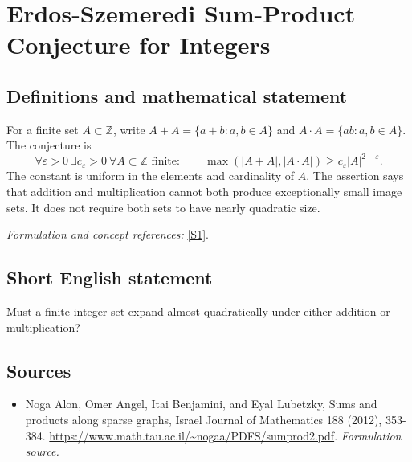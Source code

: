 \documentclass[11pt]{article}
\begin{document}
\section*{\texorpdfstring{Erdos-Szemeredi Sum-Product Conjecture for Integers}{Erdos-Szemeredi Sum-Product Conjecture for Integers}}\label{113}
\subsection{Definitions and mathematical statement}
For a finite set $A\subset{\mathbb{Z}}$, write $A+A=\{a+b:a,b\in A\}$ and $A\cdot A=\{ab:a,b\in A\}$. The conjecture is
\[
 \forall\varepsilon>0\ \exists c_\varepsilon>0\ \forall A\subset{\mathbb{Z}}\text{ finite}:\qquad
 \max(|A+A|,|A\cdot A|)\ge c_\varepsilon|A|^{2-\varepsilon}.
\]
The constant is uniform in the elements and cardinality of $A$. The assertion says that addition and multiplication cannot both produce exceptionally small image sets. It does not require both sets to have nearly quadratic size.
\par\smallskip\textit{Formulation and concept references:} \href{https://www.math.tau.ac.il/~nogaa/PDFS/sumprod2.pdf}{[S1]}.

\subsection{Short English statement}
Must a finite integer set expand almost quadratically under either addition or multiplication?
\subsection{Sources}
\begin{itemize}
\item[S1]Noga Alon, Omer Angel, Itai Benjamini, and Eyal Lubetzky, Sums and products along sparse graphs, Israel Journal of Mathematics 188 (2012), 353-384.
\url{https://www.math.tau.ac.il/~nogaa/PDFS/sumprod2.pdf}.
\textit{Formulation source.}
\end{itemize}
\end{document}
